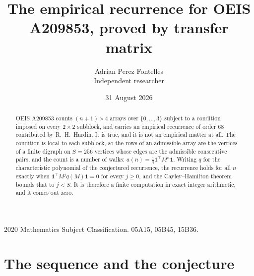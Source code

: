 \documentclass[11pt,a4paper]{article}
\title{The empirical recurrence for OEIS A209853, proved by transfer matrix}
\author{Adrian Perez Fontelles\\ \small Independent researcher}
\date{31 August 2026}
\theoremstyle{plain}
\theoremstyle{definition}
\begin{document}
\maketitle

\begin{abstract}
OEIS A209853 counts $(n+1)\times4$ arrays over $\{0,\dots,3\}$ subject to a condition imposed on
every $2\times2$ subblock, and carries an empirical recurrence of order $68$ contributed
by R.~H.~Hardin. It is true, and it is not an empirical matter at all. The condition is local
to each subblock, so the rows of an admissible array are the vertices of a finite digraph
on $S=256$ vertices whose edges are the admissible consecutive pairs, and the count is a
number of walks: $a(n)=\tfrac1{4}\mathbf{1}^{\!\top}M^{n}\mathbf{1}$. Writing $q$
for the characteristic polynomial of the conjectured recurrence, the recurrence holds for all
$n$ exactly when $\mathbf{1}^{\!\top}M^{j}q(M)\mathbf{1}=0$ for every $j\ge0$, and the
Cayley--Hamilton theorem bounds that to $j<S$. It is therefore a finite computation in exact
integer arithmetic, and it comes out zero.
\end{abstract}

\noindent\small 2020 Mathematics Subject Classification. 05A15, 05B45, 15B36.\normalsize

\section{The sequence and the conjecture}
\end{document}
